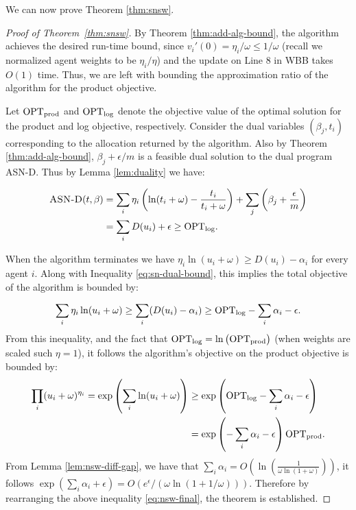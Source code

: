 We can now prove Theorem \ref{thm:snsw}.
\begin{proof}[Proof of Theorem~\ref{thm:snsw}]





By Theorem \ref{thm:add-alg-bound}, the algorithm achieves the desired run-time bound, since $v_i'(0) = \eta_i/\omega \leq 1/\omega$ (recall we normalized agent weights to be $\eta_i/\eta$) and the update on Line 8 in WBB takes $O(1)$ time.
Thus, we are left with bounding the approximation ratio of the algorithm for the product objective.  

Let $\mathrm{OPT}_\mathrm{prod}$ and $\mathrm{OPT}_\mathrm{log}$ denote the objective value of the optimal solution for the product and log objective, respectively.  
Consider the dual variables $(\beta_j, t_i)$ corresponding to the allocation returned by the algorithm.
Also by Theorem \ref{thm:add-alg-bound}, $\beta_j + \epsilon/m$ is a feasible dual solution to the dual program {\sc ASN-D}. 
Thus by Lemma \ref{lem:duality} we have:

\begin{align}
    \text{{\sc ASN-D}}(t,\beta) & = \sum_i \eta_i \left(\ln(t_i+ \omega) - \frac{t_i}{t_i+\omega}\right)+ \sum_j \left(\beta_j + \frac{\epsilon}{m}\right) \notag  \\
    &= \sum_i D(u_i) + \epsilon \geq \mathrm{OPT}_\mathrm{log} \label{eq:sn-dual-bound}. 
\end{align}

When the algorithm terminates we have $\eta_i\ln(u_i + \omega) \geq D(u_i)  - \alpha_i$ for every agent $i$. Along with Inequality \eqref{eq:sn-dual-bound}, 
this implies the total objective of the algorithm is bounded by: 

\begin{equation*}
\sum_i \eta_i \ln(u_i+\omega) \geq \sum_i (D(u_i) - \alpha_i) \geq \mathrm{OPT}_\mathrm{log}  - \sum_i \alpha_i - \epsilon.
\end{equation*}
From this inequality, and the  fact that $\mathrm{OPT}_\mathrm{log} = \ln\left(\mathrm{OPT}_\mathrm{prod}\right)$ (when weights are scaled such $\eta = 1$), it follows the algorithm's objective on the product objective is bounded by: 
\begin{alignat}{2}
\prod_i (u_i + \omega)^{\eta_i} = 
\exp\left(\sum_i \ln(u_i + \omega)\right) & \geq \exp\left(\mathrm{OPT}_\mathrm{log} - \sum_i \alpha_i -\epsilon  \right) \notag \\
& = \exp\left(- \sum_i \alpha_i -\epsilon  \right)\mathrm{OPT}_\mathrm{prod}. \label{eq:nsw-final}
\end{alignat}
From Lemma \ref{lem:nsw-diff-gap}, we have that $\sum_i \alpha_i  = O\left(\ln\left(\frac{1}{\omega\ln(1+\omega)}\right)\right)$, it follows $\exp\left(\sum_i \alpha_i +\epsilon\right) = O(e^{\epsilon}/(\omega\ln(1+1/\omega)))$. Therefore by rearranging the above inequality \eqref{eq:nsw-final}, the theorem is established. 
\end{proof}


